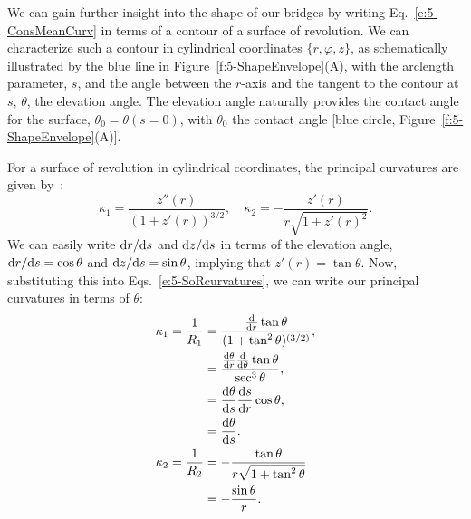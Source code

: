 We can gain further insight into the shape of our bridges by writing Eq.~\ref{e:5-ConsMeanCurv} in terms of a contour of a surface of revolution.
We can characterize such a contour in cylindrical coordinates $\{r,\varphi, z\}$, as schematically illustrated by the blue line in Figure~\ref{f:5-ShapeEnvelope}(A), with the arclength parameter, $s$, and the angle between the $r$-axis and the tangent to the contour at $s$,  $\theta$, the elevation angle.
The elevation angle naturally provides the contact angle for the surface, $\theta_0 = \theta(s=0)$, with $\theta_0$ the contact angle [blue circle, Figure~\ref{f:5-ShapeEnvelope}(A)].

For a surface of revolution in cylindrical coordinates, the principal curvatures are given by~\cite{RN35}:
\begin{equation}
  \kappa_1 = \frac{z''(r)}{(1+z'(r))^{3/2}}, \quad \kappa_2 = -\frac{z'(r)}{r\sqrt{1 + z'(r)^2}}.\label{e:5-SoRcurvatures}
\end{equation}
We can easily write ${\rm d}r/{\rm d}s$ and ${\rm d}z/{\rm d}s$ in terms of the elevation angle, ${\rm d}r/{\rm d}s = \cos \theta$ and ${\rm d}z/{\rm d}s = \sin \theta$, implying that $z'(r) = \tan \theta$.
Now, substituting this into Eqs.~\ref{e:5-SoRcurvatures}, we can write our principal curvatures in terms of $\theta$:
\begin{align}
  \kappa_1 = \frac{1}{R_1} &= \frac{\frac{\rm d}{{\rm d}r} \tan \theta}{(1 + \tan ^2 \theta)^{(3/2)}}, \\
           &= \frac{\frac{{\rm d}\theta}{{\rm d}r} \frac{\rm d}{{\rm d}\theta} \tan \theta}{\sec^3 \theta}, \\
           &= \frac{{\rm d}\theta}{{\rm d}s} \frac{{\rm d}s}{{\rm d}r} \cos \theta, \\
           &= \frac{{\rm d}\theta}{{\rm d}s}.\label{e:5-kappa1} \\
  \kappa_2 = \frac{1}{R_2} & = -\frac{\tan\theta}{r \sqrt{1 + \tan^2\theta}} \\
           &= -\frac{\sin \theta}{r}.\label{e:5-kappa2}
\end{align}

